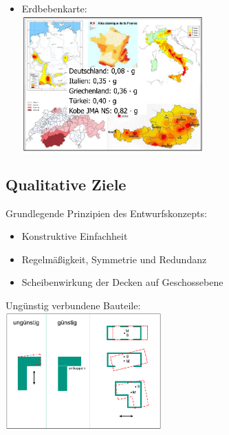 \documentclass[fleqn,twoside]{article}
\begin{document}
\begin{itemize}
                 \vspace{1mm}

            \item Erdbebenkarte:\\
                \includegraphics[width=0.55\textwidth]{Grafiken/Erdbeben/Erdbebenkarte.png}
                
        \end{itemize}


    \subsection{Qualitative Ziele}
        Grundlegende Prinzipien des Entwurfskonzepts:
            \begin{itemize}
                \item Konstruktive Einfachheit
                \item Regelmäßigkeit, Symmetrie und Redundanz
                \item Scheibenwirkung der Decken auf Geschossebene
            \end{itemize}

         \newpage   
        Ungünstig verbundene Bauteile:\\
                \includegraphics[width=0.45\textwidth]{Grafiken/Erdbeben/Unguenstig verbundene Bauteile.png}
            
\end{document}
